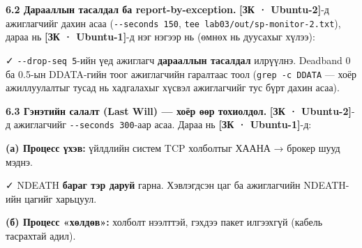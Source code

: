\textbf{6.2 Дарааллын тасалдал ба report-by-exception.} \textbf{{[}ЗК · Ubuntu-2{]}}-д ажиглагчийг дахин асаа (\texttt{-\/-seconds\ 150}, \texttt{tee\ lab03/\allowbreak{}out/\allowbreak{}sp-monitor-2.\allowbreak{}txt}), дараа нь \textbf{{[}ЗК · Ubuntu-1{]}}-д нэг нэгээр нь (өмнөх нь дуусахыг хүлээ):

\begin{Shaded}
\begin{Highlighting}[]
\end{Highlighting}
\end{Shaded}

✓ \texttt{-\/-drop-seq\ 5}-ийн үед ажиглагч \textbf{дарааллын тасалдал} илрүүлнэ. Deadband 0 ба 0.5-ын DDATA-гийн тоог ажиглагчийн гаралтаас тоол (\texttt{grep\ -c\ DDATA} --- хоёр ажиллуулалтыг тусад нь хадгалахыг хүсвэл ажиглагчийг тус бүрт дахин асаа).

\textbf{6.3 Гэнэтийн салалт (Last Will) --- хоёр өөр тохиолдол.} \textbf{{[}ЗК · Ubuntu-2{]}}-д ажиглагчийг \texttt{-\/-seconds\ 300}-аар асаа. Дараа нь \textbf{{[}ЗК · Ubuntu-1{]}}-д:

\textbf{(а) Процесс үхэв:} үйлдлийн систем TCP холболтыг ХААНА → брокер шууд мэднэ.

\begin{Shaded}
\begin{Highlighting}[]
\KeywordTok{\&}
\KeywordTok{;} \KeywordTok{;} 
\end{Highlighting}
\end{Shaded}

✓ NDEATH \textbf{бараг тэр даруй} гарна. Хэвлэгдсэн цаг ба ажиглагчийн NDEATH-ийн цагийг харьцуул.

\textbf{(б) Процесс «хөлдөв»:} холболт нээлттэй, гэхдээ пакет илгээхгүй (кабель тасрахтай адил).

\begin{Shaded}
\begin{Highlighting}[]
\KeywordTok{\&}
\KeywordTok{;} \KeywordTok{;} 
\end{Highlighting}
\end{Shaded}

